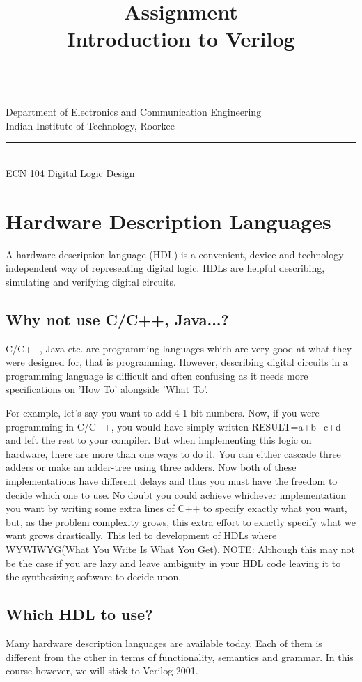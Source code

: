 \documentclass[a4paper,10pt]{article}
\makeatletter
\newcommand{\linia}{\rule{\linewidth}{0.5pt}}
\newcommand{\ano}{\text{1}}
\theoremstyle{mytheor}
\renewcommand{\maketitle}{
\begin{center}
\vspace{2ex}
{\huge \textsc{\@title}}
\vspace{1ex}
\\
Department of Electronics and Communication Engineering \\
Indian Institute of Technology, Roorkee
\linia\\
ECN 104 \hfill Digital Logic Design
\vspace{4ex}
\end{center}
}
\makeatother
\begin{document}
\title{Assignment \ano \\ Introduction to Verilog}

\maketitle

\section*{Hardware Description Languages}
A hardware description language (HDL) is a convenient, device and technology independent way of representing digital logic. HDLs are helpful describing, simulating and verifying digital circuits.

\subsection*{Why not use C/C++, Java...?} 
C/C++, Java etc. are programming languages which are very good at what they were designed for, that is programming. However, describing digital circuits in a programming language is difficult and often confusing as it needs more specifications on 'How To' alongside 'What To'.

For example, let's say you want to add 4 1-bit numbers. Now, if you were programming in C/C++, you would have simply written RESULT=a+b+c+d and left the rest to your compiler. But when implementing this logic on hardware, there are more than one ways to do it. You can either cascade three adders or make an adder-tree using three adders. Now both of these implementations have different delays and thus you must have the freedom to decide which one to use. No doubt you could achieve whichever implementation you want by writing some extra lines of C++ to specify exactly what you want, but, as the problem complexity grows, this extra effort to exactly specify what we want grows drastically. This led to development of HDLs where WYWIWYG(What You Write Is What You Get). NOTE: Although this may not be the case if you are lazy and leave ambiguity in your HDL code leaving it to the synthesizing software to decide upon. 

\subsection*{Which HDL to use?}
Many hardware description languages are available today. Each of them is different from the other in terms of functionality, semantics and grammar. In this course however, we will stick to Verilog  2001.
\end{document}
